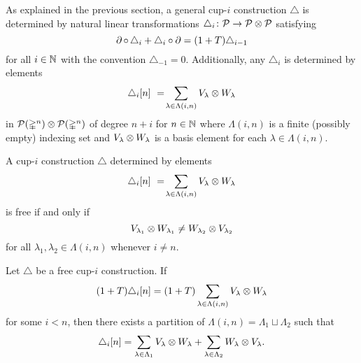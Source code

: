 %

As explained in the previous section, a general cup-$i$ construction $\triangle$ is determined by natural linear transformations $\triangle_i \colon \mathcal{P} \to \mathcal{P} \otimes \mathcal{P}$ satisfying
\[
\operatorname{\partial} \circ \, \triangle_i + \triangle_i \circ \operatorname{\partial} =
(1+T) \triangle_{i-1}
\]
for all $i \in \mathbb{N}$ with the convention $\triangle_{-1} = 0$.
Additionally, any $\triangle_i$ is determined by elements
\[
\triangle_i [n] \ = \! \sum_{\lambda \in \Lambda(i,n)} V_\lambda \ot W_\lambda
\]
in $\mathcal{P}(\mathbb{\Delta}^n) \otimes \mathcal{P}(\mathbb{\Delta}^n)$ of degree $n+i$ for $n \in \mathbb{N}$ where $\Lambda(i,n)$ is a finite (possibly empty) indexing set and $V_\lambda \otimes W_\lambda$ is a basis element for each $\lambda \in \Lambda(i,n)$.

\begin{lemma} \label{l:freeness recasted}
	A cup-$i$ construction $\triangle$ determined by elements
	\[
	\triangle_i [n] \ = \! \sum_{\lambda \in \Lambda(i,n)} {V_\lambda} \otimes {W_\lambda}
	\]
	is free if and only if
	\[
	{V_{\lambda_1}} \otimes {W_{\lambda_1}} \neq
	{W_{\lambda_2}} \otimes {V_{\lambda_2}}
	\]
	for all $\lambda_1, \lambda_2 \in \Lambda(i,n)$ whenever $i \neq n$.
\end{lemma}


\begin{lemma} \label{l:(1+T) triangle = 0 implies triangle = 0}
	Let $\triangle$ be a free cup-$i$ construction.
	If
	\[
	(1+T) \triangle_i [n] =
	(1+T) \sum_{\lambda \in \Lambda(i,n)} {V_\lambda} \otimes {W_\lambda}
	\]
	for some $i < n$, then there exists a partition of $\Lambda(i,n) = \Lambda_1 \sqcup \Lambda_2$ such that
	\begin{equation} \label{e:splitting after 1+T}
	\triangle_i [n] =
	\sum_{\lambda \in \Lambda_1} {V_\lambda} \otimes {W_\lambda} +
	\sum_{\lambda \in \Lambda_2} {W_\lambda} \otimes {V_\lambda}.
	\end{equation}
\end{lemma}

